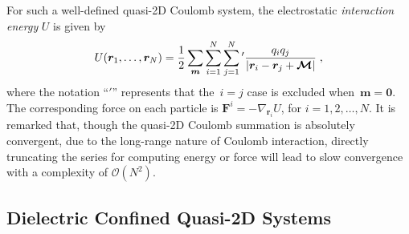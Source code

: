 For such a well-defined quasi-2D Coulomb system, the electrostatic \emph{interaction energy} $U$ is given by
\begin{equation} \label{eq::U_pair}
	U(\bm{r}_1, \ldots,\bm{r}_N)= \frac{1}{2} \sum_{\boldsymbol{m}} \sum_{i=1}^{N} \sum_{j=1}^N {}^\prime \frac{q_i q_j} {|\bm{r}_{i}-\bm{r}_{j} + \bm{\mathcal{M}}|}\;,
\end{equation}
where the notation ``$\prime$'' represents that the~$i = j$ case is excluded when~$\bm{m} = \bm{0}$.
The corresponding force on each particle is $\bm{F}^i=-\nabla_{\bm{r}_{i}} U$, for $i=1,2,\ldots, N$.
It is remarked that, though the quasi-2D Coulomb summation is absolutely convergent, due to the long-range nature of Coulomb interaction, directly truncating the series for computing energy or force will lead to slow convergence with a complexity of $\mathcal O(N^2)$.


\subsection{Dielectric Confined Quasi-2D Systems}

